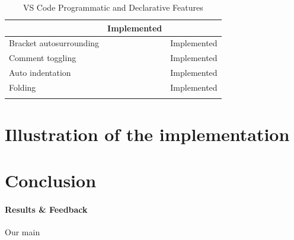 \documentclass[10pt]{article}
\begin{document}
\begin{singlespace}
\begin{longtable}[H]{| p{2in} | p{2in} | p{2in} |}
  \multicolumn{1}{p{2in}|}{} &
  Implemented \\ \hline
\multicolumn{1}{|p{2in}|}{Bracket autosurrounding} &
  \multicolumn{1}{p{2in}|}{} &
  Implemented \\ \hline
\multicolumn{1}{|p{2in}|}{Comment toggling} &
  \multicolumn{1}{p{2in}|}{} &
  Implemented
   \\ \hline
\multicolumn{1}{|p{2in}|}{Auto indentation} &
  \multicolumn{1}{p{2in}|}{} &
  Implemented
   \\ \hline
\multicolumn{1}{|p{2in}|}{Folding} &
  \multicolumn{1}{p{2in}|}{} &
  Implemented
   \\ \hline
   \caption{VS Code Programmatic and Declarative Features}
   \label{tab:vscode-features}
\end{longtable}

\section{Illustration of the implementation}
\section{Conclusion}
\paragraph*{Results \& Feedback}
Our main 


\end{singlespace}
\end{document}
